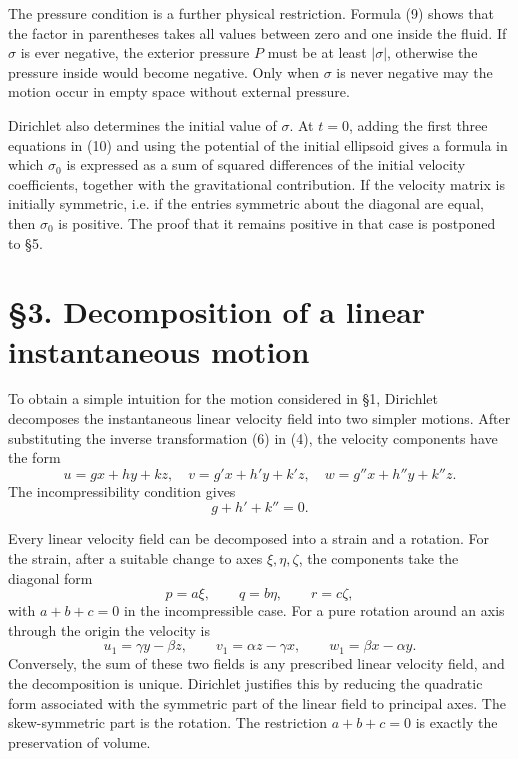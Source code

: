 \documentclass[11pt]{article}
\begin{document}
The pressure condition is a further physical restriction.  Formula (9) shows that the factor in parentheses takes all values between zero and one inside the fluid.  If \(\sigma\) is ever negative, the exterior pressure \(P\) must be at least \(|\sigma|\), otherwise the pressure inside would become negative.  Only when \(\sigma\) is never negative may the motion occur in empty space without external pressure.

Dirichlet also determines the initial value of \(\sigma\).  At \(t=0\), adding the first three equations in (10) and using the potential of the initial ellipsoid gives a formula in which \(\sigma_0\) is expressed as a sum of squared differences of the initial velocity coefficients, together with the gravitational contribution.  If the velocity matrix is initially symmetric, i.e. if the entries symmetric about the diagonal are equal, then \(\sigma_0\) is positive.  The proof that it remains positive in that case is postponed to \S5.

\section*{\S3. Decomposition of a linear instantaneous motion}

To obtain a simple intuition for the motion considered in \S1, Dirichlet decomposes the instantaneous linear velocity field into two simpler motions.  After substituting the inverse transformation (6) in (4), the velocity components have the form
\begin{equation}
 u=gx+hy+kz,
 \quad v=g'x+h'y+k'z,
 \quad w=g''x+h''y+k''z.
\end{equation}
The incompressibility condition gives
\[
 g+h'+k''=0.
\]

Every linear velocity field can be decomposed into a strain and a rotation.  For the strain, after a suitable change to axes \(\xi,\eta,\zeta\), the components take the diagonal form
\[
 p=a\xi,
 \qquad q=b\eta,
 \qquad r=c\zeta,
\]
with \(a+b+c=0\) in the incompressible case.  For a pure rotation around an axis through the origin the velocity is
\begin{equation}
 u_1=\gamma y-\beta z,
 \qquad v_1=\alpha z-\gamma x,
 \qquad w_1=\beta x-\alpha y.
\end{equation}
Conversely, the sum of these two fields is any prescribed linear velocity field, and the decomposition is unique.  Dirichlet justifies this by reducing the quadratic form associated with the symmetric part of the linear field to principal axes.  The skew-symmetric part is the rotation.  The restriction \(a+b+c=0\) is exactly the preservation of volume.
\end{document}
